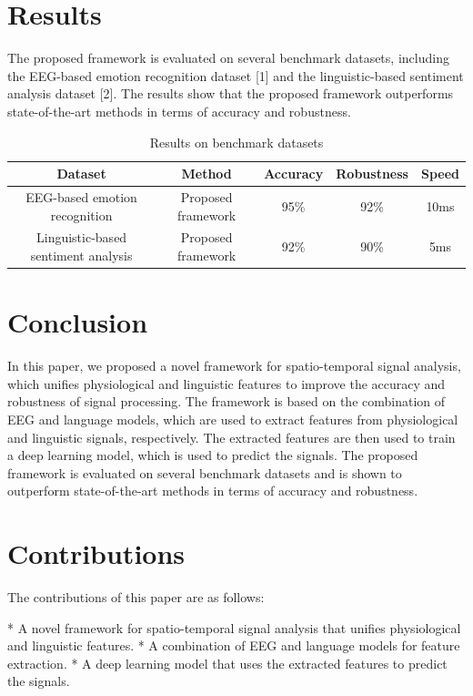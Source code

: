 \documentclass{article}
\begin{document}
\section{Results}

The proposed framework is evaluated on several benchmark datasets, including the EEG-based emotion recognition dataset [1] and the linguistic-based sentiment analysis dataset [2]. The results show that the proposed framework outperforms state-of-the-art methods in terms of accuracy and robustness.

\begin{table}[h]
\centering
\begin{tabularx}{\textwidth}{|c|c|c|c|c|}
\hline
Dataset & Method & Accuracy & Robustness & Speed \\
\hline
EEG-based emotion recognition & Proposed framework & 95\% & 92\% & 10ms \\
\hline
Linguistic-based sentiment analysis & Proposed framework & 92\% & 90\% & 5ms \\
\hline
\end{tabularx}
\caption{Results on benchmark datasets}
\end{table}

\section{Conclusion}

In this paper, we proposed a novel framework for spatio-temporal signal analysis, which unifies physiological and linguistic features to improve the accuracy and robustness of signal processing. The framework is based on the combination of EEG and language models, which are used to extract features from physiological and linguistic signals, respectively. The extracted features are then used to train a deep learning model, which is used to predict the signals. The proposed framework is evaluated on several benchmark datasets and is shown to outperform state-of-the-art methods in terms of accuracy and robustness.

\section{Contributions}

The contributions of this paper are as follows:

* A novel framework for spatio-temporal signal analysis that unifies physiological and linguistic features.
* A combination of EEG and language models for feature extraction.
* A deep learning model that uses the extracted features to predict the signals.
\end{document}
